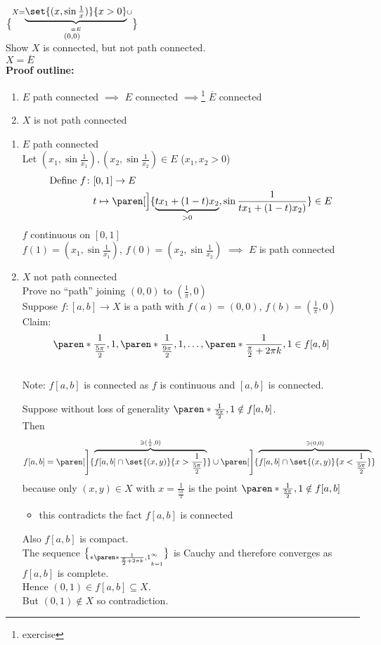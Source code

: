 \ex $X={\underbrace{\set{(x,\sin\tfrac1x)}{x>0}}_{\equiv E}}\cup\brace{(0,0)}$ \\
Show $X$ is connected, but not path connected. \\
$X=\overline{E}$ \\
\textbf{Proof outline:}\begin{enumerate}
\item $E$ path connected $\implies$ $E$ connected $\implies$\footnote{exercise} $\overline E$ connected
\item $X$ is not path connected
\end{enumerate}
\begin{enumerate}
\item $E$ path connected \\
Let $(x_1,\sin\frac1{x_1}),(x_2,\sin\frac1{x_2})\in E$ ($x_1,x_2>0$)
%
\begin{align*}
\text{Define }f\colon &[0,1]\to E \\
&t\mapsto\paren[\Big]{\underbrace{tx_1+(1-t)x_2}_{>0},\sin\frac{1}{tx_1+(1-t)x_2)}}\in E
\end{align*}
$f$ continuous on $[0,1]$ \\
$f(1)=(x_1,\sin\frac{1}{x_1})$, $f(0)=(x_2,\sin\frac{1}{x_2})$ $\implies$ $E$ is path connected
\item $X$ not path connected \\
Prove no ``path'' joining $(0,0)$ to $(\frac{1}{\pi},0)$ \\
Suppose $f\colon[a,b]\to X$ is a path with $f(a)=(0,0)$, $f(b)=(\frac{1}{\pi},0)$ \\
Claim:
\[ \paren*{\frac{1}{\frac{5\pi}{2}},1},\paren*{\frac{1}{\frac{9\pi}{2}},1},\dotsc,\paren*{\frac{1}{\frac{\pi}{2}+2\pi k},1}\in f[a,b] \] \\
Note: $f[a,b]$ is connected as $f$ is continuous and $[a,b]$ is connected.

Suppose without loss of generality $\paren*{\frac{1}{\frac{5\pi}{2}},1}\notin f[a,b]$. \\
Then
\[ f[a,b] = \paren[\Bigg]{\overbrace{f[a,b]\cap\set{(x,y)}{x>\frac{1}{\frac{5\pi}{2}}}}^{\owns(\frac1\pi,0)}} \cup \paren[\Bigg]{\overbrace{f[a,b]\cap\set{(x,y)}{x<\frac{1}{\frac{5\pi}{2}}}}^{\owns(0,0)}} \]
because only $(x,y)\in X$ with $x=\frac{1}{\frac{5\pi}{2}}$ is the point $\paren*{\frac{1}{\frac{5\pi}{2}},1}\notin f[a,b]$
\begin{itemize}
\item this contradicts the fact $f[a,b]$ is connected
\end{itemize}
Also $f[a,b]$ is compact. \\
The sequence $\brace*{\paren*{\frac{1}{\frac{\pi}{2}+2\pi k},1}}_{k=1}^\infty$ is Cauchy and therefore converges as $f[a,b]$ is complete. \\
Hence $(0,1)\in f[a,b]\subseteq X$. \\
But $(0,1)\notin X$ so contradiction.
\end{enumerate}

